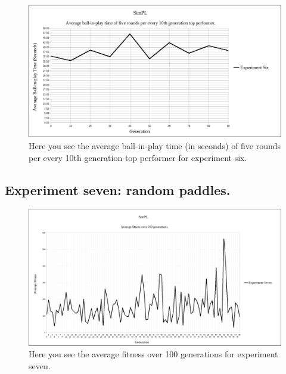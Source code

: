 \documentclass[a4paper,10pt]{article}
\begin{document}
\begin{figure}[H]  
  \centering
  \includegraphics[width=1\textwidth]{figures/exp6_10_tops_times.png}
  \caption{Here you see the average ball-in-play time (in seconds) of five rounds per every 10th generation top performer for experiment six.}
  \label{fig:exp6_10_tops_times}
\end{figure}

\subsection{Experiment seven: random paddles.}

\begin{figure}[H]  
  \centering
  \includegraphics[width=1\textwidth]{figures/exp7_avg_fit.png}
  \caption{Here you see the average fitness over 100 generations for experiment seven.}
  \label{fig:exp7_avg_fit}
\end{figure}
\end{document}
